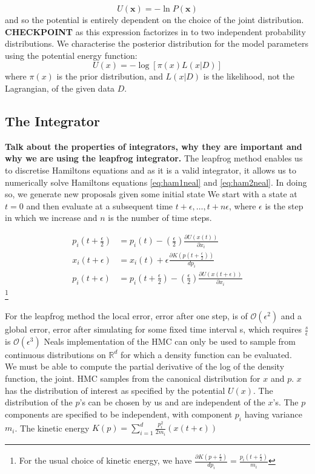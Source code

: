 \documentclass[twoside]{article}
\begin{document}
\begin{equation}
U(\textbf{x}) = -\ln P(\textbf{x})
\end{equation} and so the potential is entirely dependent on the choice of the joint distribution.
\textbf{CHECKPOINT} as this expression factorizes in to two independent probability distributions. 
We characterise the posterior distribution for the model parameters using the potential energy function: \begin{equation}
U(x) = -\log[\pi(x)L(x|D)]
\end{equation}
where $\pi(x)$ is the prior distribution, and $L(x|D)$ is the likelihood, not the Lagrangian, of the given data $D$. 

\subsection{The Integrator}

\textbf{Talk about the properties of integrators, why they are important and why we are using the leapfrog integrator.}
The leapfrog method enables us to discretise Hamiltons equations and as it is a valid integrator, it allows us to numerically solve Hamiltons equations \ref{eq:ham1neal} and \ref{eq:ham2neal}. In doing so, we generate new proposals given some initial state 
We start with a state at $t = 0$ and then evaluate at a subsequent time $t + \epsilon , \hdots, t + n\epsilon$, where $\epsilon$ is the step in which we increase and $n$ is the number of time steps. 

\begin{align}
p_{i}(t + \frac{\epsilon}{2}) &= p_{i}(t) - \left(\frac{\epsilon}{2}\right)\frac{\partial U(x(t))}{\partial x_{i}} \\
x_{i}(t + \epsilon) &= x_{i}(t) + \epsilon\frac{\partial K(p(t + \frac{\epsilon}{2}))}{dp_{i}}\\
p_{i}(t + \epsilon) &= p_{i}(t + \frac{\epsilon}{2}) - \left(\frac{\epsilon}{2}\right)\frac{\partial U(x(t+\epsilon))}{\partial x_{i}}
\end{align}
\footnote{For the usual choice of kinetic energy, we have $\frac{\partial K(p + \frac{\epsilon}{2})}{dp_{i}} = \frac{p_{i}(t + \frac{\epsilon}{2})}{m_{i}}$}

For the leapfrog method the local error, error after one step, is of $\mathcal{O}(\epsilon^{2})$ and a global error, error after simulating for some fixed time interval s, which requires $\frac{s}{\epsilon}$ is $\mathcal{O}(\epsilon^{3})$
Neals implementation of the HMC can only be used to sample from continuous distributions on $\mathbb{R}^{d}$ for which a density function can be evaluated.\\
We must be able to compute the partial derivative of the log of the density function, the joint. 
HMC samples from the canonical distribution for $x$ and $p$. $x$ has the distribution of interest as specified by the potential $U(x)$. 
The distribution of the $p$'s can be chosen by us and are independent of the $x$'s. 
The $p$ components are specified to be independent, with component $p_{i}$ having variance $m_{i}$.
The kinetic energy $K(p) = \sum_{i =1}^{d}\frac{p_{i}^{2}}{2m_{i}}(x(t + \epsilon))
$
\end{document}
